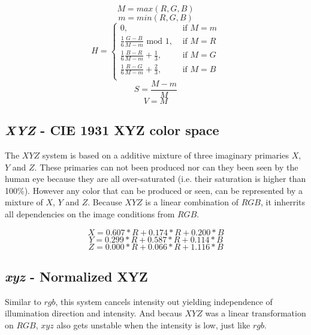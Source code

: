 \documentclass[11pt]{article}
\begin{document}
\begin{equation}
  M = max(R,G,B)
  \label{eq:M}
\end{equation}
\begin{equation}
  m = min(R,G,B)
  \label{eq:m}
\end{equation}
\begin{equation}
  H =
    \left\{\begin{array}{ll}
      0, & \textrm{~if~} M = m \\
      \frac{1}{6}\frac{G-B}{M-m} \textrm{~mod~} 1,& \textrm{~if~} M = R \\
      \frac{1}{6}\frac{B-R}{M-m} + \frac{1}{3},& \textrm{~if~} M = G \\
      \frac{1}{6}\frac{R-G}{M-m} + \frac{2}{3},& \textrm{~if~} M = B \\      
    \end{array}\right.
  \label{eq:H}
\end{equation}
\begin{equation}
  S = \frac{M-m}{M}
  \label{eq:S}
\end{equation}
\begin{equation}
  V = M
  \label{eq:V}
\end{equation}

\subsection{\textit{XYZ} - CIE 1931 XYZ color space}
The $XYZ$ system is based on a additive mixture of three imaginary primaries
$X$, $Y$ and $Z$. These primaries can not been produced nor can they been seen by the human
eye because they are all over-saturated (i.e. their saturation is higher than
100\%). However any color that can be produced or seen, can be represented by a
mixture of $X$, $Y$ and $Z$. Because $XYZ$ is a linear combination of $RGB$, it
inherrits all dependencies on the image conditions from $RGB$.

\begin{equation}
  X = 0.607 * R + 0.174 * R + 0.200 * B
  \label{eq:X}
\end{equation}
\begin{equation}
  Y = 0.299 * R + 0.587 * R + 0.114 * B
  \label{eq:Y}
\end{equation}
\begin{equation}
  Z = 0.000 * R + 0.066 * R + 1.116 * B
  \label{eq:Z}
\end{equation}

\subsection{\textit{xyz} - Normalized XYZ}
Similar to $rgb$, this system cancels intensity out yielding independence of
illumination direction and intensity. And becaus $XYZ$ was a linear
transformation on $RGB$, $xyz$ also gets unstable when the intensity is low,
just like $rgb$.
\end{document}
